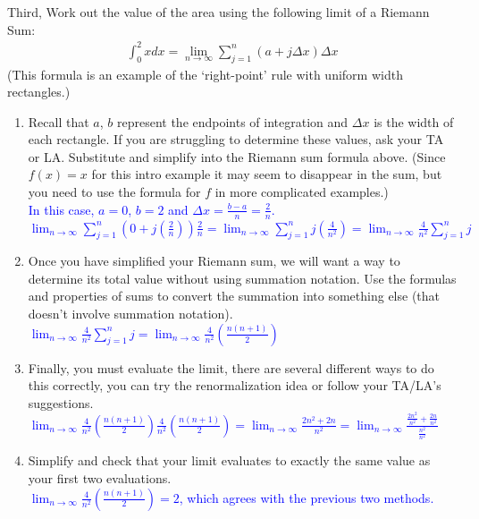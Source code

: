 \documentclass{ximera}
\begin{document}
\begin{exercise}
    Third, Work out the value of the area using the following limit of a Riemann Sum:
\begin{align}
	\int_{0}^2 x dx = \lim_{n\rightarrow \infty} \sum_{j=1}^n (a + j\Delta x)\Delta x \nonumber
\end{align}
    (This formula is an example of the `right-point' rule with uniform width rectangles.)\\
    \begin{enumerate}
        \item Recall that $a$, $b$ represent the endpoints of integration and $\Delta x$ is the width of each rectangle.  If you are struggling to determine these values, ask your TA or LA. Substitute and simplify into the Riemann sum formula above. (Since $f(x)=x$ for this intro example it may seem to disappear in the sum, but you need to use the formula for $f$ in more complicated examples.)\\
        \textcolor{blue}{In this case, $a=0$, $b=2$ and $\Delta x=\frac{b-a}{n}=\frac{2}{n}$.\\
$\displaystyle\lim_{n\rightarrow \infty}\sum_{j=1}^{n}(0+j(\frac2n))\frac{2}{n}=\lim_{n\rightarrow \infty}\sum_{j=1}^n j(\frac{4}{n^2})=\lim_{n\rightarrow \infty}\frac{4}{n^2}\sum_{j=1}^n j$}
        
        \item Once you have simplified your Riemann sum, we will want a way to determine its total value without using summation notation. Use the formulas and properties of sums to convert the summation into something else (that doesn't involve summation notation).\\
        \textcolor{blue}{$\displaystyle \lim_{n\rightarrow \infty}\frac{4}{n^2}\sum_{j=1}^n j=\lim_{n\rightarrow \infty} \frac{4}{n^2}(\frac{n(n+1)}{2})$}
        
        \item Finally, you must evaluate the limit, there are several different ways to do this correctly, you can try the renormalization idea or follow your TA/LA's suggestions.\\
        \textcolor{blue}{$\displaystyle\lim_{n\rightarrow \infty} \frac{4}{n^2}(\frac{n(n+1)}{2})\frac{4}{n^2}(\frac{n(n+1)}{2})=\lim_{n\rightarrow \infty} \frac{2n^2+2n}{n^2}=\lim_{n\rightarrow \infty}\frac{\frac{2n^2}{n^2}+\frac{2n}{n^2}}{\frac{n^2}{n^2}}$}


        \item Simplify and check that your limit evaluates to exactly the same value as your first two evaluations.\\
        \textcolor{blue}{$\displaystyle\lim_{n\rightarrow \infty} \frac{4}{n^2}(\frac{n(n+1)}{2})=2$, which agrees with the previous two methods.}


\end{enumerate}
\end{exercise}
\end{document}
